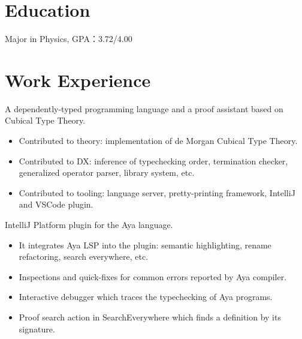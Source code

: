 \documentclass{resume}
\begin{document}
\renewcommand\headrulewidth{0pt}



\section{Education}
  Major in Physics, GPA：3.72/4.00

\section{Work Experience}

A dependently-typed programming language and a proof assistant based on Cubical Type Theory.
\begin{itemize}
  \item Contributed to theory: implementation of de Morgan Cubical Type Theory.
  \item Contributed to DX: inference of typechecking order, termination checker, generalized operator parser, library system, etc.
  \item Contributed to tooling: language server, pretty-printing framework, IntelliJ and VSCode plugin.
\end{itemize}

IntelliJ Platform plugin for the Aya language.
\begin{itemize}
  \item It integrates Aya LSP into the plugin: semantic highlighting, rename refactoring, search everywhere, etc.
  \item Inspections and quick-fixes for common errors reported by Aya compiler.
  \item Interactive debugger which traces the typechecking of Aya programs.
  \item Proof search action in SearchEverywhere which finds a definition by its signature.
\end{itemize}
\end{document}
